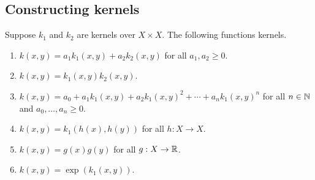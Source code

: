 
\subsection{Constructing kernels}

\begin{theorem}
    \cite{rudin2020notes,shawe2004kernel}
    Suppose \(k_1\) and \(k_2\) are kernels over \(X \times X\).
    The following functions kernels.
    \begin{enumerate}
        \item \(k(x,y) = a_1 k_1(x,y) + a_2 k_2(x,y)\) for all \(a_1, a_2 \geq 0\).
        \item \(k(x,y) = k_1(x,y) k_2(x,y)\).
        \item \(k(x,y) = a_0 + a_1 k_1(x,y) + a_2 k_1(x,y)^2 + \cdots + a_n k_1(x,y)^n\) for all \(n \in \mathbb{N}\) and \(a_0, \dots, a_n \geq 0\).
        \item \(k(x,y) = k_1(h(x),h(y))\) for all \(h : X \to X\).
        \item \(k(x,y) = g(x)g(y)\) for all \(g : X \to \mathbb{R}\).
        \item \(k(x,y) = \exp(k_1(x,y))\).
    \end{enumerate}
\end{theorem}

